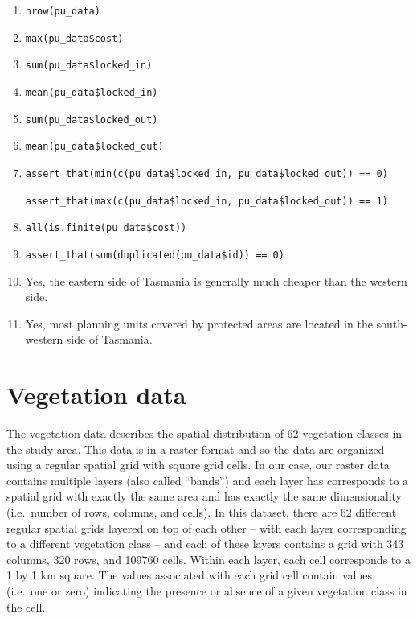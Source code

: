 \documentclass[12pt,]{book}
\providecommand{\tightlist}{%
  \setlength{\itemsep}{0pt}\setlength{\parskip}{0pt}}
\let\BeginKnitrBlock\begin \let\EndKnitrBlock\end
\begin{document}
\BeginKnitrBlock{rmdanswer}
\begin{enumerate}
\def\labelenumi{\arabic{enumi}.}
\tightlist
\item
  \texttt{nrow(pu\_data)}
\item
  \texttt{max(pu\_data\$cost)}
\item
  \texttt{sum(pu\_data\$locked\_in)}
\item
  \texttt{mean(pu\_data\$locked\_in)}
\item
  \texttt{sum(pu\_data\$locked\_out)}
\item
  \texttt{mean(pu\_data\$locked\_out)}
\item
  \texttt{assert\_that(min(c(pu\_data\$locked\_in,\ pu\_data\$locked\_out))\ ==\ 0)}
  \newline

  \texttt{assert\_that(max(c(pu\_data\$locked\_in,\ pu\_data\$locked\_out))\ ==\ 1)}
\item
  \texttt{all(is.finite(pu\_data\$cost))}
\item
  \texttt{assert\_that(sum(duplicated(pu\_data\$id))\ ==\ 0)}
\item
  Yes, the eastern side of Tasmania is generally much cheaper than the
  western side.
\item
  Yes, most planning units covered by protected areas are located in the
  south-western side of Tasmania.
\end{enumerate}
\EndKnitrBlock{rmdanswer}

\section{Vegetation data}\label{vegetation-data}

The vegetation data describes the spatial distribution of 62 vegetation
classes in the study area. This data is in a raster format and so the
data are organized using a regular spatial grid with square grid cells.
In our case, our raster data contains multiple layers (also called
``bands'') and each layer has corresponds to a spatial grid with exactly
the same area and has exactly the same dimensionality (i.e.~number of
rows, columns, and cells). In this dataset, there are 62 different
regular spatial grids layered on top of each other -- with each layer
corresponding to a different vegetation class -- and each of these
layers contains a grid with 343 columns, 320 rows, and 109760 cells.
Within each layer, each cell corresponds to a 1 by 1 km square. The
values associated with each grid cell contain values (i.e.~one or zero)
indicating the presence or absence of a given vegetation class in the
cell.
\end{document}
